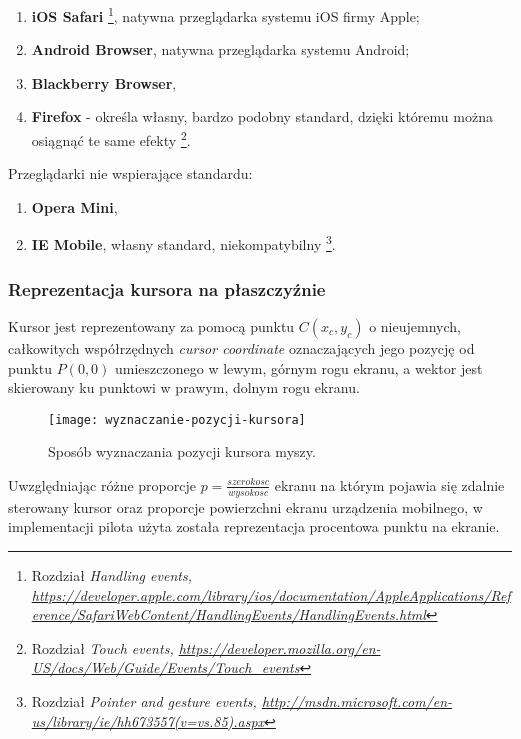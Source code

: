 \begin{enumerate}
  \item \textbf{iOS Safari}\cite{browser-ios-safari} \footnote{\cite{browser-ios-safari} Rozdział \em{Handling events}, \url{https://developer.apple.com/library/ios/documentation/AppleApplications/Reference/SafariWebContent/HandlingEvents/HandlingEvents.html}}, natywna przeglądarka systemu iOS firmy Apple;
  \item \textbf{Android Browser}, natywna przeglądarka systemu Android;
  \item \textbf{Blackberry Browser},
  \item \textbf{Firefox} - określa własny, bardzo podobny standard, dzięki któremu można osiągnąć te same efekty\cite{browser-firefox} \footnote{\cite{browser-firefox} Rozdział \em{Touch events}, \url{https://developer.mozilla.org/en-US/docs/Web/Guide/Events/Touch_events}}.
\end{enumerate}

Przeglądarki nie wspierające standardu:

\begin{enumerate}
  \item \textbf{Opera Mini},
  \item \textbf{IE Mobile}, własny standard, niekompatybilny\cite{browser-ie} \footnote{\cite{browser-ie} Rozdział \em{Pointer and gesture events}, \url{http://msdn.microsoft.com/en-us/library/ie/hh673557(v=vs.85).aspx}}.
\end{enumerate}

\subsubsection{Reprezentacja kursora na płaszczyźnie}

Kursor jest reprezentowany za pomocą punktu \(C(x_{c}, y_{c})\) o nieujemnych, całkowitych współrzędnych \emph{cursor coordinate} oznaczających jego pozycję od punktu \(P(0, 0)\) umieszczonego w lewym, górnym rogu ekranu, a wektor jest skierowany ku punktowi w prawym, dolnym rogu ekranu.

\begin{figure}[h!]
  \caption{Sposób wyznaczania pozycji kursora myszy.}
  \centering
    \texttt{[image: wyznaczanie-pozycji-kursora]}
\end{figure}

Uwzględniając różne proporcje \(p = \frac{szerokosc}{wysokosc}\) ekranu na którym pojawia się zdalnie sterowany kursor oraz proporcje powierzchni ekranu urządzenia mobilnego, w implementacji pilota użyta została reprezentacja procentowa punktu na ekranie.

